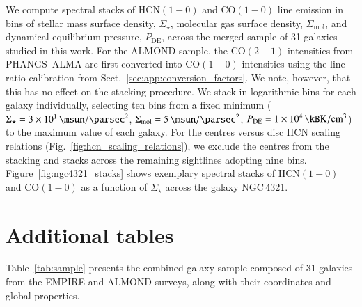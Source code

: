 \documentclass[letter, longauth]{aa} %
\newcommand*{\hcnone}{\ensuremath{\mathrm{HCN(1-0)}}\xspace} %
\newcommand*{\coone}{\ensuremath{\mathrm{CO(1-0)}}\xspace} %
\newcommand*{\cotwo}{\ensuremath{\mathrm{CO(2-1)}}\xspace} %
\newcommand*{\sigmol}{\ensuremath{\Sigma_{\text{mol}}}\xspace}  %
\newcommand*{\pde}{\ensuremath{P_{\text{DE}}}\xspace}  %
\newcommand*{\sigstar}{\ensuremath{\Sigma_{\star}}\xspace}  %
\begin{document}
\begin{appendix}
We compute spectral stacks of \hcnone and \coone line emission in bins of stellar mass surface density, \sigstar, molecular gas surface density, \sigmol, and dynamical equilibrium pressure, \pde, across the merged sample of 31 galaxies studied in this work.
For the ALMOND sample, the \cotwo intensities from PHANGS--ALMA are first converted into \coone intensities using the line ratio calibration from Sect.~\ref{sec:app:conversion_factors}. 
We note, however, that this has no effect on the stacking procedure. 
We stack in logarithmic bins for each galaxy individually, selecting ten bins from a fixed minimum ($\sigstar=\SI{3e1}{\msun\per\square\parsec}$, $\sigmol=\SI{5e0}{\msun\per\square\parsec}$, $\pde=\SI{1e4}{\kB\kelvin\per\cubic\cm}$) to the maximum value of each galaxy.
For the centres versus disc HCN scaling relations (Fig.~\ref{fig:hcn_scaling_relations}), we exclude the centres from the stacking and stacks across the remaining sightlines adopting nine bins.
Figure~\ref{fig:ngc4321_stacks} shows exemplary spectral stacks of \hcnone and \coone as a function of \sigstar across the galaxy NGC\,4321.

\section{Additional tables}
\label{sec:app:fig_tab}

Table~\ref{tab:sample} presents the combined galaxy sample composed of 31 galaxies from the EMPIRE and ALMOND surveys, along with their coordinates and global properties.


\end{appendix}
\end{document}
